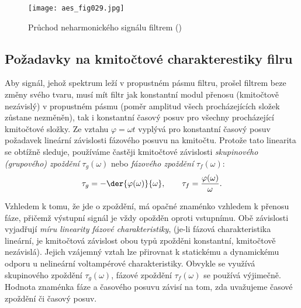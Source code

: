       \begin{figure}[ht!]
        \centering
        \texttt{[image: aes\_fig029.jpg]}
        \caption{Průchod neharmonického signálu filtrem (\cite[s.~29]{HajekSedlacek2002})}
        \label{aes:fig029}    
      \end{figure}
    
    \subsection{Požadavky na kmitočtové charakterestiky filru} 
      Aby signál, jehož spektrum leží v propustném pásmu filtru, prošel filtrem beze změny svého
      tvaru, musí mít filtr jak konstantní modul přenosu (kmitočtově nezávislý) v propustném pásmu
      (poměr amplitud všech procházejících složek zůstane nezměněn), tak i konstantní časový posuv
      pro všechny procházející kmitočtové složky. Ze vztahu \(\varphi = \omega t\) vyplývá pro
      konstantní časový posuv požadavek lineární závislosti fázového posuvu na kmitočtu. Protože
      tato linearita se obtížně sleduje, používáme častěji kmitočtové závislosti \emph{skupinového
      (grupového) zpoždění} \(\tau_g(\omega)\) nebo \emph{fázového zpoždění} \(\tau_f(\omega)\): 
      \begin{equation*}
        \tau_g = -\der{\varphi(\omega)}{\omega}, \qquad \tau_f = \frac{\varphi(\omega)}{\omega}.
      \end{equation*}
      
      Vzhledem k tomu, že jde o zpoždění, má opačné znaménko vzhledem k přenosu fáze, přičemž
      výstupní signál je vždy opožděn oproti vstupnímu. Obě závislosti vyjadřují \emph{míru
      linearity fázové charakteristiky}, (je-li fázová charakteristika lineární, je kmitočtová
      závislost obou typů zpožděni konstantní, kmitočtově nezávislá). Jejich vzájemný vztah lze
      přirovnat k statickému a dynamickému odporu u nelineární voltampérové charakteristiky.
      Obvykle se využívá skupinového zpoždění \(\tau_g(\omega)\), fázové zpoždění
      \(\tau_f(\omega)\) se používá výjimečně. Hodnota znaménka fáze a časového posuvu závisí na
      tom, zda uvažujeme časové zpoždění či časový posuv.      
    
